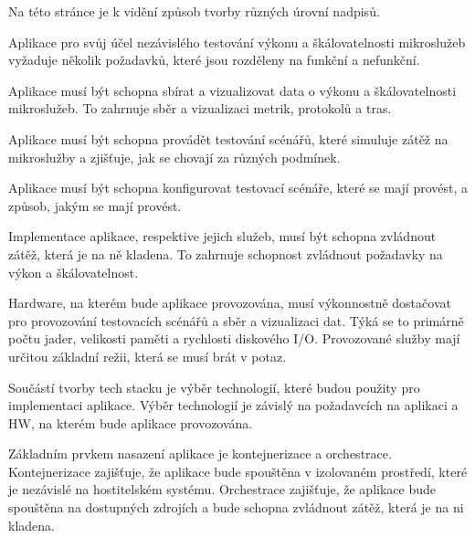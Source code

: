 
Na této stránce je k vidění způsob tvorby různých úrovní nadpisů.


Aplikace pro svůj účel nezávislého testování výkonu a škálovatelnosti mikroslužeb vyžaduje několik požadavků, které jsou rozděleny na funkční a nefunkční.



Aplikace musí být schopna sbírat a vizualizovat data o výkonu a škálovatelnosti mikroslužeb. To zahrnuje sběr a vizualizaci metrik, protokolů a tras.


Aplikace musí být schopna provádět testování scénářů, které simuluje zátěž na mikroslužby a zjišťuje, jak se chovají za různých podmínek.


Aplikace musí být schopna konfigurovat testovací scénáře, které se mají provést, a způsob, jakým se mají provést.



Implementace aplikace, respektive jejich služeb, musí být schopna zvládnout zátěž, která je na ně kladena. To zahrnuje schopnost zvládnout požadavky na výkon a škálovatelnost.


Hardware, na kterém bude aplikace provozována, musí výkonnostně dostačovat pro provozování testovacích scénářů a sběr a vizualizaci dat. Týká se to primárně počtu jader, velikosti paměti a rychlosti diskového I/O. Provozované služby mají určitou základní režii, která se musí brát v potaz.


Součástí tvorby tech stacku je výběr technologií, které budou použity pro implementaci aplikace. Výběr technologií je závislý na požadavcích na aplikaci a HW, na kterém bude aplikace provozována.


Základním prvkem nasazení aplikace je kontejnerizace a orchestrace. Kontejnerizace zajišťuje, že aplikace bude spouštěna v izolovaném prostředí, které je nezávislé na hostitelském systému. Orchestrace zajišťuje, že aplikace bude spouštěna na dostupných zdrojích a bude schopna zvládnout zátěž, která je na ni kladena.

